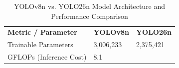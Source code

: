 \documentclass[12pt,a4paper,oneside]{report}
\begin{document}
\begin{longtable}[]{@{}
  >{\raggedright\arraybackslash}p{}
  >{\raggedright\arraybackslash}p{}
  >{\raggedright\arraybackslash}p{}@{}}
\caption{YOLOv8n vs. YOLO26n Model Architecture and Performance
Comparison\label{tab:table26}}\\

\toprule\noalign{}
\begin{minipage}[b]{\linewidth}\raggedright

\textbf{Metric / Parameter}

\end{minipage} & \begin{minipage}[b]{\linewidth}\centering

\textbf{YOLOv8n}

\end{minipage} & \begin{minipage}[b]{\linewidth}\centering

\textbf{YOLO26n}

\end{minipage} \\
\begin{minipage}[b]{\linewidth}\raggedright

Trainable Parameters

\end{minipage} & \begin{minipage}[b]{\linewidth}\centering

3,006,233

\end{minipage} & \begin{minipage}[b]{\linewidth}\centering

2,375,421

\end{minipage} \\
\begin{minipage}[b]{\linewidth}\raggedright

GFLOPs (Inference Cost)

\end{minipage} & \begin{minipage}[b]{\linewidth}\centering

8.1

\end{minipage} & \begin{minipage}[b]{\linewidth}\centering


\end{minipage}
\end{longtable}
\end{document}
